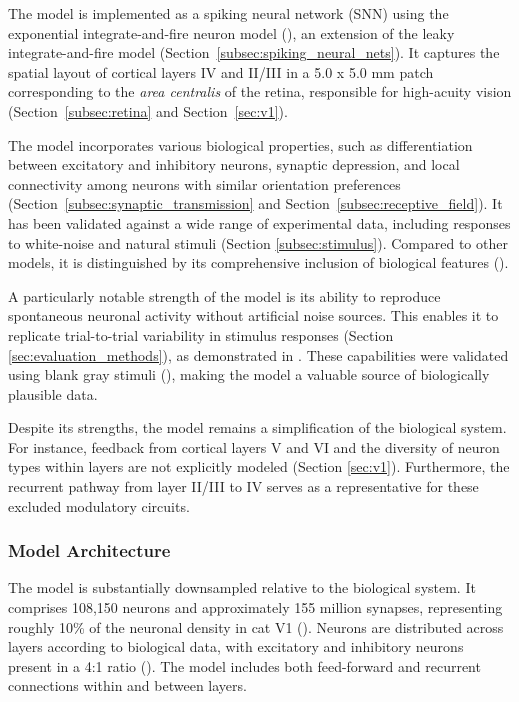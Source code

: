 The model is implemented as a spiking neural network (SNN) using the exponential integrate-and-fire neuron model (\citet{FourcaudTrocm11628}), an extension of the leaky integrate-and-fire model (Section~\ref{subsec:spiking_neural_nets}). It captures the spatial layout of cortical layers IV and II/III in a 5.0 x 5.0 mm patch corresponding to the \emph{area centralis} of the retina, responsible for high-acuity vision (Section~\ref{subsec:retina} and Section~\ref{sec:v1}).

The model incorporates various biological properties, such as differentiation between excitatory and inhibitory neurons, synaptic depression, and local connectivity among neurons with similar orientation preferences (Section~\ref{subsec:synaptic_transmission} and Section~\ref{subsec:receptive_field}). It has been validated against a wide range of experimental data, including responses to white-noise and natural stimuli (Section \ref{subsec:stimulus}). Compared to other models, it is distinguished by its comprehensive inclusion of biological features (\citet{antolik2024comprehensive}).

A particularly notable strength of the model is its ability to reproduce spontaneous neuronal activity without artificial noise sources. This enables it to replicate trial-to-trial variability in stimulus responses (Section \ref{sec:evaluation_methods}), as demonstrated in \citet{baudot_animation_2013}. These capabilities were validated using blank gray stimuli (\citet{PAPAIOANNOU1972558}), making the model a valuable source of biologically plausible data.

Despite its strengths, the model remains a simplification of the biological system. For instance, feedback from cortical layers V and VI and the diversity of neuron types within layers are not explicitly modeled (Section \ref{sec:v1}). Furthermore, the recurrent pathway from layer II/III to IV serves as a representative for these excluded modulatory circuits.

\subsubsection{Model Architecture}
\label{subsubsec:spiking_cat_architecture}
The model is substantially downsampled relative to the biological system. It comprises 108,150 neurons and approximately 155 million synapses, representing roughly 10\% of the neuronal density in cat V1 (\citet{beaulie1989number}). Neurons are distributed across layers according to biological data, with excitatory and inhibitory neurons present in a 4:1 ratio (\citet{bealuliee1992quantitative, markram_interneurons_2004}). The model includes both feed-forward and recurrent connections within and between layers.

